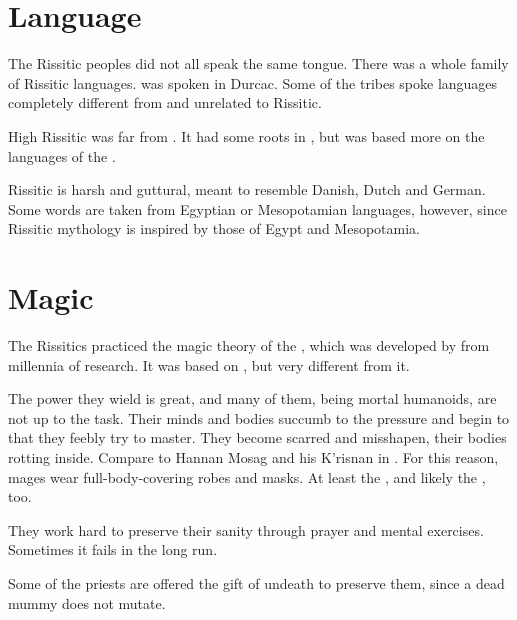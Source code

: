 \section{Language}
The Rissitic peoples did not all speak the same tongue.
There was a whole family of Rissitic languages. 
 was spoken in Durcac.
Some of the tribes spoke languages completely different from and unrelated to Rissitic.

High Rissitic was far from \Ortaican. 
It had some roots in \Ortaican, but was based more on the languages of the . 

Rissitic is harsh and guttural, meant to resemble Danish, Dutch and German. Some words are taken from Egyptian or Mesopotamian languages, however, since Rissitic mythology is inspired by those of Egypt and Mesopotamia. 















\section{Magic}
The Rissitics practiced the magic theory of the , which was developed by \RissitNechsain{} from millennia of research. 
It was based on , but very different from it.

The power they wield is great, and many of them, being mortal humanoids, are not up to the task. 
Their minds and bodies succumb to the pressure and begin to  that they feebly try to master. 
They become scarred and misshapen, their bodies rotting inside. 
Compare to Hannan Mosag and his K'risnan in \cite{StevenEriksonIanCameronEsslemont:MalazanBookoftheFallen}. 
For this reason, mages wear full-body-covering robes and masks. 
At least the \Shessefkesad, and likely the \Dzeyrgvin{}, too. 

They work hard to preserve their sanity through prayer and mental exercises. 
Sometimes it fails in the long run. 

Some of the priests are offered the gift of undeath to preserve them, since a dead mummy does not mutate. 

